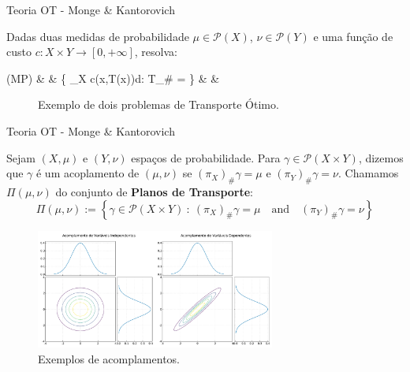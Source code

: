 \documentclass[10pt]{beamer}
\begin{document}
\begin{frame}[fragile]{Teoria OT - Monge \& Kantorovich}

	\begin{definition}
		Dadas duas medidas de probabilidade $\mu \in \mathcal P(X)$,
		$\nu \in \mathcal{P}(Y)$ e uma função de custo
		$c:X\times Y \to[0,+\infty]$, resolva:
		\begin{flalign}
			(MP)     &  &
			\inf
			\left\{
			\int_{X} c(x,T(x))d\mu \quad : \quad
			T_\# \mu = \nu
			\right\} &  &
		\end{flalign}

	\end{definition}

	\begin{figure}[H]
		\centering
		\def\svgscale{0.45}
		
		\caption{Exemplo de dois problemas de Transporte Ótimo.}
		\label{fig:monge_map_example}
	\end{figure}

\end{frame}

\begin{frame}[fragile]{Teoria OT - Monge \& Kantorovich}

	\begin{definition}
		Sejam $(X,\mu)$ e $(Y,\nu)$ espaços de probabilidade. Para
		$\gamma \in \mathcal{P}(X\times Y)$, dizemos que $\gamma$
		é um acoplamento de $(\mu,\nu)$ se $(\pi_X)_\# \gamma = \mu$
		e $(\pi_Y)_\# \gamma = \nu$. Chamamos $\Pi(\mu,\nu)$
		do conjunto de \textbf{Planos de Transporte}:
		\begin{equation}
			\Pi(\mu,\nu) :=
			\left \{
			\gamma \in \mathcal{P}(X \times Y) \ :
			\ (\pi_X)_\# \gamma = \mu \quad
			\text{and} \quad
			(\pi_Y)_\# \gamma = \nu
			\right \}
		\end{equation}
	\end{definition}

	\begin{figure}[H]
		\begin{center}
			\includegraphics[width=0.7\textwidth]{Figures/coupling.pdf}
		\end{center}
		\caption{Exemplos de acomplamentos.}
	\end{figure}

\end{frame}
\end{document}

